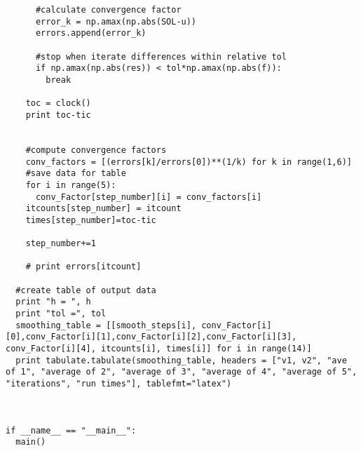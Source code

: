 \documentclass[12pt]{article}
\begin{document}
\begin{verbatim}
      #calculate convergence factor
      error_k = np.amax(np.abs(SOL-u))
      errors.append(error_k)

      #stop when iterate differences within relative tol
      if np.amax(np.abs(res)) < tol*np.amax(np.abs(f)):
        break

    toc = clock()
    print toc-tic


    #compute convergence factors
    conv_factors = [(errors[k]/errors[0])**(1/k) for k in range(1,6)]
    #save data for table
    for i in range(5):
      conv_Factor[step_number][i] = conv_factors[i]
    itcounts[step_number] = itcount
    times[step_number]=toc-tic

    step_number+=1

    # print errors[itcount]

  #create table of output data
  print "h = ", h
  print "tol =", tol
  smoothing_table = [[smooth_steps[i], conv_Factor[i][0],conv_Factor[i][1],conv_Factor[i][2],conv_Factor[i][3], conv_Factor[i][4], itcounts[i], times[i]] for i in range(14)]
  print tabulate.tabulate(smoothing_table, headers = ["v1, v2", "ave of 1", "average of 2", "average of 3", "average of 4", "average of 5", "iterations", "run times"], tablefmt="latex")



if __name__ == "__main__":
  main()
\end{verbatim}
\end{document}
